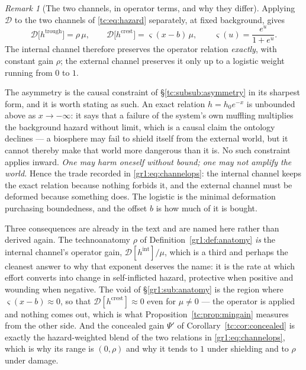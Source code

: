 \documentclass[11pt]{article}
\numberwithin{equation}{section}
\theoremstyle{plain}
\theoremstyle{definition}
\theoremstyle{remark}
\newtheorem{remark}[theorem]{Remark}
\begin{document}
\begin{remark}[The two channels, in operator terms, and why they differ]
\label{gr1:rem:channelsoperator}
Applying $\mathcal D$ to the two channels of \eqref{tc:eq:hazard}
separately, at fixed background, gives
\begin{equation}\label{gr1:eq:channelops}
\mathcal D\bigl[h^{\mathrm{trough}}\bigr]=\rho\,\mu,
\qquad
\mathcal D\bigl[h^{\mathrm{crest}}\bigr]=\varsigma(x-b)\,\mu,
\qquad
\varsigma(u)=\frac{e^{u}}{1+e^{u}} .
\end{equation}
The internal channel therefore preserves the operator relation
\emph{exactly}, with constant gain $\rho$; the external channel
preserves it only up to a logistic weight running from $0$ to $1$.

The asymmetry is the causal constraint of
\S\ref{tc:subsub:asymmetry} in its sharpest form, and it is worth
stating as such. An exact relation $h=h_0e^{-x}$ is unbounded above as
$x\to-\infty$: it says that a failure of the system's own muffling
multiplies the background hazard without limit, which is a causal claim
the ontology declines --- a biosphere may fail to shield itself from the
external world, but it cannot thereby make that world more dangerous
than it is. No such constraint applies inward. \emph{One may harm
oneself without bound; one may not amplify the world.} Hence the trade
recorded in \eqref{gr1:eq:channelops}: the internal channel keeps the
exact relation because nothing forbids it, and the external channel must
be deformed because something does. The logistic is the minimal
deformation purchasing boundedness, and the offset $b$ is how much of it
is bought.

Three consequences are already in the text and are named here rather
than derived again. The technoanatomy $\rho$ of
Definition~\ref{gr1:def:anatomy} \emph{is} the internal channel's
operator gain, $\mathcal D[h^{\mathrm{int}}]/\mu$, which is a third and
perhaps the cleanest answer to why that exponent deserves the name: it
is the rate at which effort converts into change in self-inflicted
hazard, protective when positive and wounding when negative. The void
of \S\ref{gr1:sub:anatomy} is the region where $\varsigma(x-b)\approx0$,
so that $\mathcal D[h^{\mathrm{crest}}]\approx0$ even for $\mu\neq0$ ---
the operator is applied and nothing comes out, which is what
Proposition~\ref{tc:prop:mingain} measures from the other side. And the
concealed gain $\Psi'$ of Corollary~\ref{tc:cor:concealed} is exactly
the hazard-weighted blend of the two relations in
\eqref{gr1:eq:channelops}, which is why its range is $(0,\rho)$ and why
it tends to $1$ under shielding and to $\rho$ under damage.
\end{remark}
\end{document}
